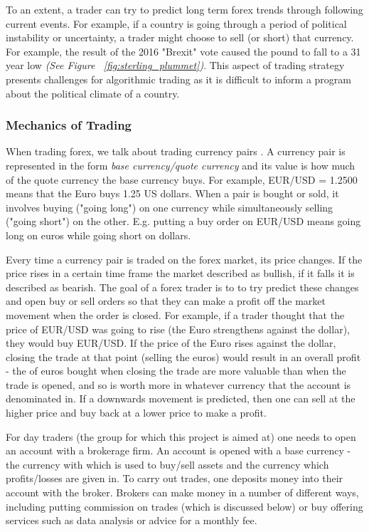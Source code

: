         To an extent, a trader can try to predict long term forex trends through following current events. For example, if a country is going through a period of political instability or uncertainty, a trader might choose to sell (or short) that currency. For example, the result of the 2016 "Brexit" vote caused the pound to fall to a 31 year low \cite{bbc_news_2016} \textit{(See Figure ~\ref{fig:sterling_plummet})}. This aspect of trading strategy presents challenges for algorithmic trading as it is difficult to inform a program about the political climate of a country. 



            \subsubsection{Mechanics of Trading}
            When trading forex, we talk about trading currency pairs \cite{hannah_2017}. A currency pair is represented in the form \textit{base currency/quote currency} and its value is how much of the quote currency the base currency buys. For example, EUR/USD = 1.2500 means that the Euro buys 1.25 US dollars. When a pair is bought or sold, it involves buying ("going long") on one currency while simultaneously selling ("going short") on the other. E.g. putting a buy order on EUR/USD means going long on euros while going short on dollars.

            Every time a currency pair is traded on the forex market, its price changes. If the price rises in a certain time frame the market described as bullish, if it falls it is described as bearish. The goal of a forex trader is to to try predict these changes and  open buy or sell orders so that they can make a profit off the market movement when the order is closed. For example, if a trader thought that the price of EUR/USD was going to rise (the Euro strengthens against the dollar), they would buy EUR/USD. If the price of the Euro rises against the dollar, closing the trade at that point (selling the euros) would result in an overall profit - the of euros bought when closing the trade are more valuable than when the trade is opened, and so is worth more in whatever currency that the account is denominated in. If a downwards movement is predicted, then one can sell at the higher price and buy back at a lower price to make a profit.

            For day traders (the group for which this project is aimed at) one needs to open an account with a brokerage firm. An account is opened with a base currency - the currency with which is used to buy/sell assets and the currency which profits/losses are given in. To carry out trades, one deposits money into their account with the broker. Brokers can make money in a number of different ways, including putting commission on trades (which is discussed below) or buy offering services such as data analysis or advice for a monthly fee. 


